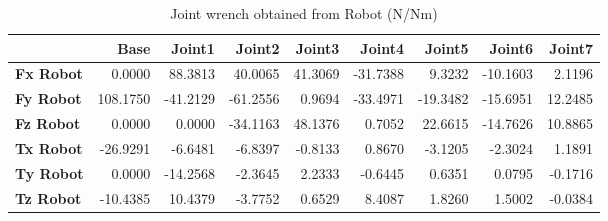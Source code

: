 \begin{table}[h!]
	\centering
	\caption{Joint wrench obtained from Robot (N/Nm)}
	\label{wrech_Robot_Pose1}
	\begin{tabular}{|l|r|r|r|r|r|r|r|r|}
		\hline
		\textbf{} & \textbf{Base} & \textbf{Joint1}  & \textbf{Joint2}  & \textbf{Joint3}  & \textbf{Joint4}  & \textbf{Joint5}  & \textbf{Joint6}  & \textbf{Joint7} \\ \hline
		\textbf{Fx Robot}  & 0.0000        & 88.3813        & 40.0065        & 41.3069        & -31.7388        & 9.3232        & -10.1603        & 2.1196 \\ \hline
		\textbf{Fy Robot}  & 108.1750        & -41.2129        & -61.2556        & 0.9694        & -33.4971        & -19.3482        & -15.6951        & 12.2485 \\ \hline
		\textbf{Fz Robot}  & 0.0000        & 0.0000        & -34.1163        & 48.1376        & 0.7052        & 22.6615        & -14.7626        & 10.8865 \\ \hline
		\textbf{Tx Robot}  & -26.9291        & -6.6481        & -6.8397        & -0.8133        & 0.8670        & -3.1205        & -2.3024        & 1.1891 \\ \hline
		\textbf{Ty Robot}  & 0.0000        & -14.2568        & -2.3645        & 2.2333        & -0.6445        & 0.6351        & 0.0795        & -0.1716 \\ \hline
		\textbf{Tz Robot}  & -10.4385        & 10.4379        & -3.7752        & 0.6529        & 8.4087        & 1.8260        & 1.5002        & -0.0384 \\ \hline
	\end{tabular}
\end{table}


